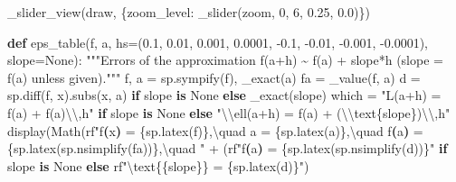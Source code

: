 \documentclass[
  letterpaper,
  DIV=11,
  numbers=noendperiod]{scrreprt}
\newenvironment{Shaded}{\begin{snugshade}}{\end{snugshade}}
\newcommand{\CharTok}[1]{\textcolor[rgb]{0.13,0.47,0.30}{#1}}
\newcommand{\CommentTok}[1]{\textcolor[rgb]{0.37,0.37,0.37}{#1}}
\newcommand{\ControlFlowTok}[1]{\textcolor[rgb]{0.00,0.23,0.31}{\textbf{#1}}}
\newcommand{\DecValTok}[1]{\textcolor[rgb]{0.68,0.00,0.00}{#1}}
\newcommand{\ErrorTok}[1]{\textcolor[rgb]{0.68,0.00,0.00}{#1}}
\newcommand{\FloatTok}[1]{\textcolor[rgb]{0.68,0.00,0.00}{#1}}
\newcommand{\KeywordTok}[1]{\textcolor[rgb]{0.00,0.23,0.31}{\textbf{#1}}}
\newcommand{\NormalTok}[1]{\textcolor[rgb]{0.00,0.23,0.31}{#1}}
\newcommand{\OperatorTok}[1]{\textcolor[rgb]{0.37,0.37,0.37}{#1}}
\newcommand{\SpecialCharTok}[1]{\textcolor[rgb]{0.37,0.37,0.37}{#1}}
\newcommand{\StringTok}[1]{\textcolor[rgb]{0.13,0.47,0.30}{#1}}
\newcommand{\VariableTok}[1]{\textcolor[rgb]{0.07,0.07,0.07}{#1}}
\newcommand{\VerbatimStringTok}[1]{\textcolor[rgb]{0.13,0.47,0.30}{#1}}
\theoremstyle{plain}
\theoremstyle{plain}
\theoremstyle{definition}
\theoremstyle{definition}
\theoremstyle{definition}
\theoremstyle{plain}
\theoremstyle{plain}
\theoremstyle{remark}
\begin{document}
\begin{Shaded}
\begin{Highlighting}[]
\NormalTok{    \_slider\_view(draw, \{}\StringTok{\textquotesingle{}zoom\_level\textquotesingle{}}\NormalTok{: \_slider(}\StringTok{\textquotesingle{}zoom\textquotesingle{}}\NormalTok{, }\DecValTok{0}\NormalTok{, }\DecValTok{6}\NormalTok{, }\FloatTok{0.25}\NormalTok{, }\FloatTok{0.0}\NormalTok{)\})}


\KeywordTok{def}\NormalTok{ eps\_table(f, a, hs}\OperatorTok{=}\NormalTok{(}\FloatTok{0.1}\NormalTok{, }\FloatTok{0.01}\NormalTok{, }\FloatTok{0.001}\NormalTok{, }\FloatTok{0.0001}\NormalTok{, }\OperatorTok{{-}}\FloatTok{0.1}\NormalTok{, }\OperatorTok{{-}}\FloatTok{0.01}\NormalTok{, }\OperatorTok{{-}}\FloatTok{0.001}\NormalTok{, }\OperatorTok{{-}}\FloatTok{0.0001}\NormalTok{), slope}\OperatorTok{=}\VariableTok{None}\NormalTok{):}
    \CommentTok{"""Errors of the approximation f(a+h) \textasciitilde{} f(a) + slope*h (slope = f\textquotesingle{}(a) unless given)."""}
\NormalTok{    f, a }\OperatorTok{=}\NormalTok{ sp.sympify(f), \_exact(a)}
\NormalTok{    fa }\OperatorTok{=}\NormalTok{ \_value(f, a)}
\NormalTok{    d }\OperatorTok{=}\NormalTok{ sp.diff(f, x).subs(x, a) }\ControlFlowTok{if}\NormalTok{ slope }\KeywordTok{is} \VariableTok{None} \ControlFlowTok{else}\NormalTok{ \_exact(slope)}
\NormalTok{    which }\OperatorTok{=} \StringTok{"L(a+h) = f(a) + f\textquotesingle{}(a)}\CharTok{\textbackslash{}\textbackslash{}}\StringTok{,h"} \ControlFlowTok{if}\NormalTok{ slope }\KeywordTok{is} \VariableTok{None} \ControlFlowTok{else} \StringTok{"}\CharTok{\textbackslash{}\textbackslash{}}\StringTok{ell(a+h) = f(a) + (}\CharTok{\textbackslash{}\textbackslash{}}\StringTok{text}\SpecialCharTok{\{slope\}}\StringTok{)}\CharTok{\textbackslash{}\textbackslash{}}\StringTok{,h"}
\NormalTok{    display(Math(}\VerbatimStringTok{rf"f}\KeywordTok{(}\VerbatimStringTok{x}\KeywordTok{)}\VerbatimStringTok{ = }\SpecialCharTok{\{}\NormalTok{sp}\SpecialCharTok{.}\NormalTok{latex(f)}\SpecialCharTok{\}}\VerbatimStringTok{,}\ErrorTok{\textbackslash{}}\VerbatimStringTok{quad a = }\SpecialCharTok{\{}\NormalTok{sp}\SpecialCharTok{.}\NormalTok{latex(a)}\SpecialCharTok{\}}\VerbatimStringTok{,}\ErrorTok{\textbackslash{}}\VerbatimStringTok{quad f}\KeywordTok{(}\VerbatimStringTok{a}\KeywordTok{)}\VerbatimStringTok{ = }\SpecialCharTok{\{}\NormalTok{sp}\SpecialCharTok{.}\NormalTok{latex(sp.nsimplify(fa))}\SpecialCharTok{\}}\VerbatimStringTok{,}\ErrorTok{\textbackslash{}}\VerbatimStringTok{quad "}
                 \OperatorTok{+}\NormalTok{ (}\VerbatimStringTok{rf"f\textquotesingle{}}\KeywordTok{(}\VerbatimStringTok{a}\KeywordTok{)}\VerbatimStringTok{ = }\SpecialCharTok{\{}\NormalTok{sp}\SpecialCharTok{.}\NormalTok{latex(sp.nsimplify(d))}\SpecialCharTok{\}}\VerbatimStringTok{"} \ControlFlowTok{if}\NormalTok{ slope }\KeywordTok{is} \VariableTok{None} \ControlFlowTok{else} \VerbatimStringTok{rf"}\CharTok{\textbackslash{}t}\VerbatimStringTok{ext}\CharTok{\{\{}\VerbatimStringTok{slope}\CharTok{\}\}}\VerbatimStringTok{ = }\SpecialCharTok{\{}\NormalTok{sp}\SpecialCharTok{.}\NormalTok{latex(d)}\SpecialCharTok{\}}\VerbatimStringTok{"}\NormalTok{)}

\end{Highlighting}
\end{Shaded}
\end{document}

